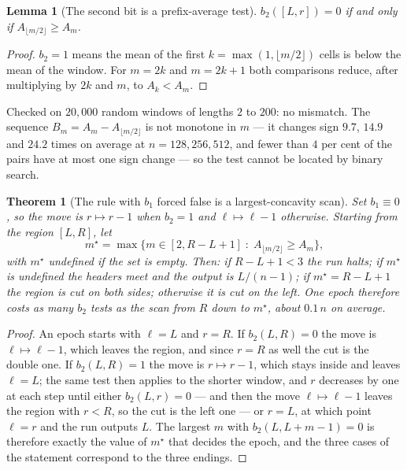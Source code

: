 \documentclass[11pt]{article}
\newtheorem{theorem}{Theorem}
\newtheorem{lemma}{Lemma}
\begin{document}
\begin{lemma}[The second bit is a prefix-average test]\label{lem:prefix}
$b_2([L,r])=0$ if and only if $A_{\lfloor m/2\rfloor}\ge A_m$.
\end{lemma}

\begin{proof}
$b_2=1$ means the mean of the first $k=\max(1,\lfloor m/2\rfloor)$ cells is below the mean of the
window. For $m=2k$ and $m=2k+1$ both comparisons reduce, after multiplying by $2k$ and $m$, to
$A_k<A_m$.
\end{proof}

Checked on $20{,}000$ random windows of lengths $2$ to $200$: no mismatch. The sequence
$B_m=A_m-A_{\lfloor m/2\rfloor}$ is not monotone in $m$ --- it changes sign $9.7$, $14.9$ and $24.2$
times on average at $n=128,256,512$, and fewer than $4$ per cent of the pairs have at most one sign
change --- so the test cannot be located by binary search.

\begin{theorem}[The rule with $b_1$ forced false is a largest-concavity scan]\label{thm:concavity}
Set $b_1\equiv0$, so the move is $r\mapsto r-1$ when $b_2=1$ and $\ell\mapsto\ell-1$ otherwise.
Starting from the region $[L,R]$, let
\[
m^\star=\max\{m\in[2,R-L+1]\;:\;A_{\lfloor m/2\rfloor}\ge A_m\},
\]
with $m^\star$ undefined if the set is empty. Then: if $R-L+1<3$ the run halts; if $m^\star$ is
undefined the headers meet and the output is $L/(n-1)$; if $m^\star=R-L+1$ the region is cut on both
sides; otherwise it is cut on the left. One epoch therefore costs as many $b_2$ tests as the scan from
$R$ down to $m^\star$, about $0.1\,n$ on average.
\end{theorem}

\begin{proof}
An epoch starts with $\ell=L$ and $r=R$. If $b_2(L,R)=0$ the move is $\ell\mapsto\ell-1$, which
leaves the region, and since $r=R$ as well the cut is the double one. If $b_2(L,R)=1$ the move is
$r\mapsto r-1$, which stays inside and leaves $\ell=L$; the same test then applies to the shorter
window, and $r$ decreases by one at each step until either $b_2(L,r)=0$ --- and then the move
$\ell\mapsto\ell-1$ leaves the region with $r<R$, so the cut is the left one --- or $r=L$, at which
point $\ell=r$ and the run outputs $L$. The largest $m$ with $b_2(L,L+m-1)=0$ is therefore exactly
the value of $m^\star$ that decides the epoch, and the three cases of the statement correspond to
the three endings.
\end{proof}
\end{document}
